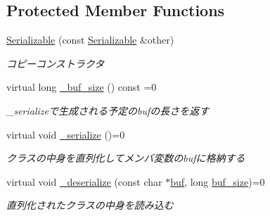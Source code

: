\subsection*{Protected Member Functions}
\begin{DoxyCompactItemize}
\item 
\hypertarget{classskl_1_1_serializable_af62d2ecb4f263cbd1099c6d32e9a0558}{}\label{classskl_1_1_serializable_af62d2ecb4f263cbd1099c6d32e9a0558} 
\hyperlink{classskl_1_1_serializable_af62d2ecb4f263cbd1099c6d32e9a0558}{Serializable} (const \hyperlink{classskl_1_1_serializable}{Serializable} \&other)
\begin{DoxyCompactList}\small\item\em コピーコンストラクタ \end{DoxyCompactList}\item 
\hypertarget{classskl_1_1_serializable_a489e26e25bacf78d0dae50f0286c62b5}{}\label{classskl_1_1_serializable_a489e26e25bacf78d0dae50f0286c62b5} 
virtual long \hyperlink{classskl_1_1_serializable_a489e26e25bacf78d0dae50f0286c62b5}{\+\_\+buf\+\_\+size} () const =0
\begin{DoxyCompactList}\small\item\em \+\_\+serializeで生成される予定のbufの長さを返す \end{DoxyCompactList}\item 
\hypertarget{classskl_1_1_serializable_a1ebe63f20226d3e63fb13e25720b5339}{}\label{classskl_1_1_serializable_a1ebe63f20226d3e63fb13e25720b5339} 
virtual void \hyperlink{classskl_1_1_serializable_a1ebe63f20226d3e63fb13e25720b5339}{\+\_\+serialize} ()=0
\begin{DoxyCompactList}\small\item\em クラスの中身を直列化してメンバ変数のbufに格納する \end{DoxyCompactList}\item 
\hypertarget{classskl_1_1_serializable_a63a6d619bb4d2fd9f5bf423a544e514c}{}\label{classskl_1_1_serializable_a63a6d619bb4d2fd9f5bf423a544e514c} 
virtual void \hyperlink{classskl_1_1_serializable_a63a6d619bb4d2fd9f5bf423a544e514c}{\+\_\+deserialize} (const char $\ast$\hyperlink{classskl_1_1_serializable_a1d203d9f0049ce37183a0dcefbc6399a}{buf}, long \hyperlink{classskl_1_1_serializable_a087eb19fada917a42b8411bfecbac0f1}{buf\+\_\+size})=0
\begin{DoxyCompactList}\small\item\em 直列化されたクラスの中身を読み込む \end{DoxyCompactList}\end{DoxyCompactItemize}
